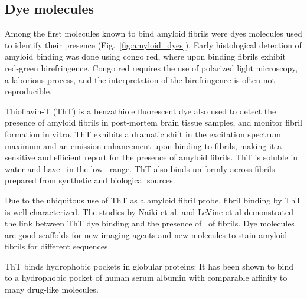 \subsection{Dye molecules}

Among the first molecules known to bind amyloid fibrils were dyes molecules used to identify their presence (Fig.~\ref{fig:amyloid_dyes}). Early histological detection of amyloid binding was done using congo red, where upon binding fibrils exhibit red-green birefringence. Congo red requires the use of polarized light microscopy, a laborious process, and the interpretation of the birefringence is often not reproducible.


Thioflavin-T (ThT) is a benzathiole fluorescent dye also used to detect the presence of amyloid fibrils in post-mortem brain tissue samples, and monitor fibril formation in vitro. ThT exhibits a dramatic shift in the excitation spectrum maximum and an emission enhancement upon binding to fibrils, making it a sensitive and efficient report for the presence of amyloid fibrils.  ThT is soluble in water and have \KD\ in the low \micromolar\ range.  ThT also binds uniformly across fibrils prepared from synthetic and biological sources.

Due to the ubiquitous use of ThT as a amyloid fibril probe, fibril binding by ThT is well-characterized. The studies by Naiki et al. and LeVine et al demonstrated the link between ThT dye binding and the presence of \crossbs\ of fibrils.
Dye molecules are good scaffolds for new imaging agents and new molecules to stain amyloid fibrils for different sequences.


ThT binds hydrophobic pockets in globular proteins: It has been shown to bind to a hydrophobic pocket of human serum albumin with comparable affinity to many drug-like molecules.\cite{Groenning:2007p3436,Groenning:2007eo}

